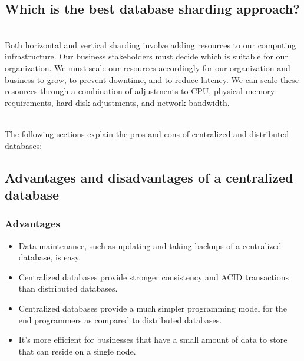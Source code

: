 

\subsection{Which is the best database sharding approach?}\label{yZXpLx2rhbuKn_JN-nLhL}
\\
Both horizontal and vertical sharding involve adding resources to our computing infrastructure. Our business stakeholders must decide which is suitable for our organization. We must scale our resources accordingly for our organization and business to grow, to prevent downtime, and to reduce latency. We can scale these resources through a combination of adjustments to CPU, physical memory requirements, hard disk adjustments, and network bandwidth.\\
\strut \\
The following sections explain the pros and cons of centralized and distributed databases:

\subsection{Advantages and disadvantages of a centralized database}\label{UwsBl0ukWeQln5m_zv3K9}

\subsubsection{Advantages}\label{v_bHQ0K0zIqqrfCt0V3di}

\begin{itemize}
\item
\protect{}\label{JKx-vff9zBdUnwxP4lTTO}
Data maintenance, such as updating and taking backups of a centralized database, is easy.
\item
\protect{}\label{Wy890jXtO79KmI-VYakL2}
Centralized databases provide stronger consistency and ACID transactions than distributed databases.
\item
\protect{}\label{twVL2h0YYWg6_rLcJno_Z}
Centralized databases provide a much simpler programming model for the end programmers as compared to distributed databases.
\item
\protect{}\label{2XwFp2k7s2b_jEamdqzt5}
It's more efficient for businesses that have a small amount of data to store that can reside on a single node.
\end{itemize}

